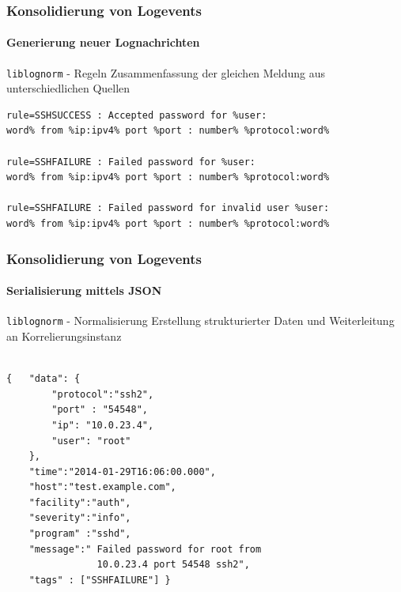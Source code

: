 \begin{frame}[fragile]
\frametitle{Konsolidierung von Logevents}
\framesubtitle{Generierung neuer Lognachrichten }

\begin{block}{\texttt{liblognorm} - Regeln}
\centering Zusammenfassung der gleichen Meldung aus unterschiedlichen Quellen
\end{block}


\begin{center}
\begin{minipage}{0.9\textwidth}
\begin{verbatim}
rule=SSHSUCCESS : Accepted password for %user:
word% from %ip:ipv4% port %port : number% %protocol:word%

rule=SSHFAILURE : Failed password for %user:
word% from %ip:ipv4% port %port : number% %protocol:word%

rule=SSHFAILURE : Failed password for invalid user %user:
word% from %ip:ipv4% port %port : number% %protocol:word%

\end{verbatim}
\end{minipage}
\end{center}
\end{frame}

\begin{frame}[fragile]
\frametitle{Konsolidierung von Logevents}
\framesubtitle{Serialisierung mittels JSON}

\begin{block}{\texttt{liblognorm} - Normalisierung}
\centering Erstellung strukturierter Daten und Weiterleitung an Korrelierungsinstanz
\end{block}

\begin{center}
    \begin{minipage}{0.7\textwidth}
        \begin{verbatim}
        
{   "data": {
        "protocol":"ssh2",
        "port" : "54548",
        "ip": "10.0.23.4",
        "user": "root"
    },
    "time":"2014-01-29T16:06:00.000",
    "host":"test.example.com",
    "facility":"auth",
    "severity":"info",
    "program" :"sshd",
    "message":" Failed password for root from
                10.0.23.4 port 54548 ssh2",
    "tags" : ["SSHFAILURE"] }
        \end{verbatim}
    \end{minipage}
\end{center}
\end{frame}

